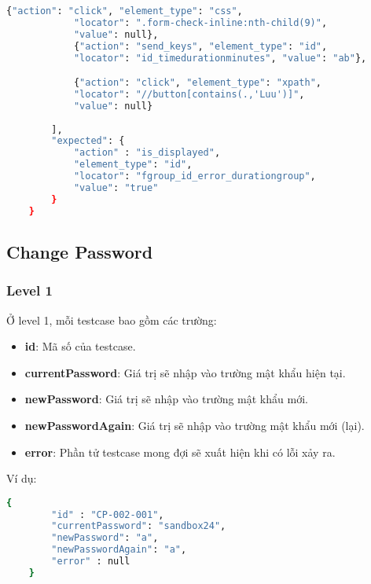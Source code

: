 \begin{lstlisting}[language=bash, caption={Ví dụ testcase CE-002-007 ở level 2}, breaklines=true]
            {"action": "click", "element_type": "css", 
            "locator": ".form-check-inline:nth-child(9)", 
            "value": null},
            {"action": "send_keys", "element_type": "id", 
            "locator": "id_timedurationminutes", "value": "ab"},

            {"action": "click", "element_type": "xpath", 
            "locator": "//button[contains(.,'Luu')]", 
            "value": null}
            
        ],
        "expected": {
            "action" : "is_displayed",
            "element_type": "id",
            "locator": "fgroup_id_error_durationgroup",
            "value": "true"
        }
    }
\end{lstlisting}

\subsection{Change Password}
\subsubsection{Level 1}
Ở level 1, mỗi testcase bao gồm các trường:
\begin{itemize}
    \item \textbf{id}: Mã số của testcase.
    \item \textbf{currentPassword}: Giá trị sẽ nhập vào trường mật khẩu hiện tại.
    \item \textbf{newPassword}: Giá trị sẽ nhập vào trường mật khẩu mới.
    \item \textbf{newPasswordAgain}: Giá trị sẽ nhập vào trường mật khẩu mới (lại).
    \item \textbf{error}: Phần tử testcase mong đợi sẽ xuất hiện khi có lỗi xảy ra.
\end{itemize}

Ví dụ:
\begin{lstlisting}[language=bash, caption={Ví dụ testcase CP-002-001 ở level 1}]
    {
        "id" : "CP-002-001",
        "currentPassword": "sandbox24",
        "newPassword": "a",
        "newPasswordAgain": "a",
        "error" : null
    }
\end{lstlisting}
